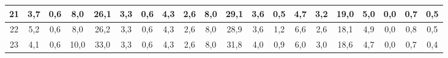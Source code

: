 \begin{sidewaystable}[]
\begin{tabular}{|c|c|c|c|c|c|c|c|c|c|c|c|c|c|c|c|c|c|c|c|}
    21 & 3,7                                              & 0,6                                              & 8,0                                              & 26,1                                             & 3,3                                              & 0,6                                              & 4,3                                              & 2,6                                              & 8,0                                              & 29,1                                             & 3,6                                              & 0,5                                              & 4,7                                              & 3,2                                              & 19,0                                             & 5,0                                              & 0,0                                              & 0,7                                              & 0,5                                              \\ \hline
    22 & 5,2                                              & 0,6                                              & 8,0                                              & 26,2                                             & 3,3                                              & 0,6                                              & 4,3                                              & 2,6                                              & 8,0                                              & 28,9                                             & 3,6                                              & 1,2                                              & 6,6                                              & 2,6                                              & 18,1                                             & 4,9                                              & 0,0                                              & 0,8                                              & 0,5                                              \\ \hline
    23 & 4,1                                              & 0,6                                              & 10,0                                             & 33,0                                             & 3,3                                              & 0,6                                              & 4,3                                              & 2,6                                              & 8,0                                              & 31,8                                             & 4,0                                              & 0,9                                              & 6,0                                              & 3,0                                              & 18,6                                             & 4,7                                              & 0,0                                              & 0,7                                              & 0,4                                              \\ \hline

\end{tabular}
\end{sidewaystable}
